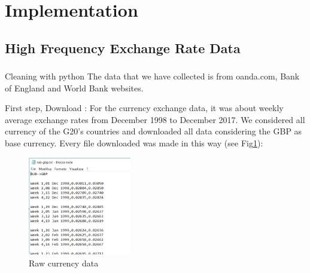 \section{Implementation}
\subsection{High Frequency Exchange Rate Data}
\subsubsection{}{Cleaning with python}
\newline
The data that we have collected is from oanda.com, Bank of England and World Bank websites. 
\newline

First step, Download : For the currency exchange data, it was about weekly average exchange rates from December 1998 to December 2017. We considered all currency of the G20's countries and downloaded all data considering the GBP as base currency\cite{abbate2018point}. Every file downloaded was made in this way (see Fig\ref{raw_curr}): 

\begin{figure}[!h]
	\begin{center}
		\includegraphics[width=0.40\textwidth]{aaa2.png}
		\caption{Raw currency data}
		\label{raw_curr}
	\end{center}
\end{figure}


